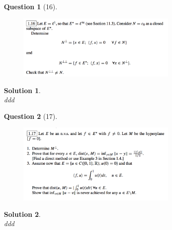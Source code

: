 \documentclass{article} %
\theoremstyle{quest}
\newtheorem*{question}{Question}
\newtheorem*{solution}{Solution}
\begin{document}
\newpage

\begin{question}[16]
\hfill
\begin{figure}[h!]
  \centering
    \includegraphics[width=0.7\textwidth]{funcA-1-16.png}
\end{figure}
\end{question}
\begin{solution} \hfill \\
ddd 
\end{solution}

\newpage

\begin{question}[17]
\hfill
\begin{figure}[h!]
  \centering
    \includegraphics[width=0.7\textwidth]{funcA-1-17.png}
\end{figure}
\end{question}
\begin{solution} \hfill \\
ddd 
\end{solution}
\end{document}
